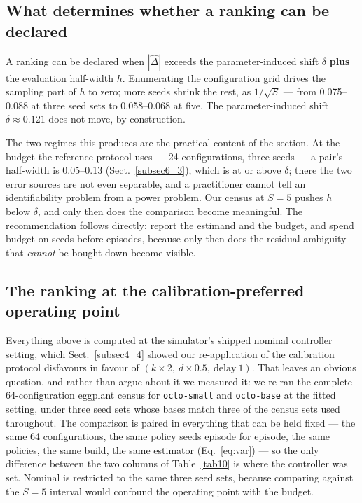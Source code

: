 \documentclass[pdflatex,iicol,sn-apa]{sn-jnl}
\theoremstyle{remark}
\begin{document}
\subsection{What determines whether a ranking can be declared}\label{subsec7_6}

A ranking can be declared when $|\hat\Delta|$ exceeds the parameter-induced shift $\delta$
\textbf{plus} the evaluation half-width $h$. Enumerating the configuration grid drives the sampling
part of $h$ to zero; more seeds shrink the rest, as $1/\sqrt{S}$ --- from 0.075--0.088 at three seed
sets to 0.058--0.068 at five. The parameter-induced shift $\delta \approx 0.121$ does not move, by
construction.

The two regimes this produces are the practical content of the section. At the budget the reference
protocol uses --- 24 configurations, three seeds --- a pair's half-width is 0.05--0.13
(Sect.~\ref{subsec6_3}), which is at or above $\delta$; there the two error sources are not even
separable, and a practitioner cannot tell an identifiability problem from a power problem. Our census
at $S = 5$ pushes $h$ below $\delta$, and only then does the comparison become meaningful. The
recommendation follows directly: report the estimand and the budget, and spend budget on seeds
before episodes, because only then does the residual ambiguity that \emph{cannot} be bought down
become visible.

\subsection{The ranking at the calibration-preferred operating point}\label{subsec7_7}

Everything above is computed at the simulator's shipped nominal controller setting, which
Sect.~\ref{subsec4_4} showed our re-application of the calibration protocol disfavours in favour of
$(k{\times}2,\ d{\times}0.5,\ \text{delay}\ 1)$. That leaves an obvious question, and rather than
argue about it we measured it: we re-ran the complete 64-configuration eggplant census for
\texttt{octo-small} and \texttt{octo-base} at the fitted setting, under three seed sets whose bases
match three of the census sets used throughout. The comparison is paired in everything that can be
held fixed --- the same 64 configurations, the same policy seeds episode for episode, the same
policies, the same build, the same estimator (Eq.~\eqref{eq:var}) --- so the only difference between
the two columns of Table~\ref{tab10} is where the controller was set. Nominal is restricted to the
same three seed sets, because comparing against the $S=5$ interval would confound the operating
point with the budget.
\end{document}
